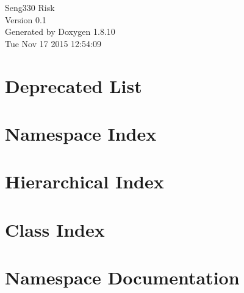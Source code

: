 \documentclass[twoside]{book}
\newcommand{\+}{\discretionary{\mbox{\scriptsize$\hookleftarrow$}}{}{}}
\newcommand{\clearemptydoublepage}{%
  \newpage{\pagestyle{empty}\cleardoublepage}%
}
\begin{document}
\hypersetup{pageanchor=false,
             bookmarks=true,
             bookmarksnumbered=true,
             pdfencoding=unicode
            }
\begin{titlepage}
\vspace*{7cm}
\begin{center}%
{\Large Seng330 Risk \\[1ex]\large Version 0.\+1 }\\
\vspace*{1cm}
{\large Generated by Doxygen 1.8.10}\\
\vspace*{0.5cm}
{\small Tue Nov 17 2015 12:54:09}\\
\end{center}
\end{titlepage}
\clearemptydoublepage
\tableofcontents
\clearemptydoublepage
{}
\hypersetup{pageanchor=true}

\chapter{Deprecated List}
\label{deprecated}
\hypertarget{deprecated}{}

\chapter{Namespace Index}

\chapter{Hierarchical Index}

\chapter{Class Index}

\chapter{Namespace Documentation}

\end{document}
